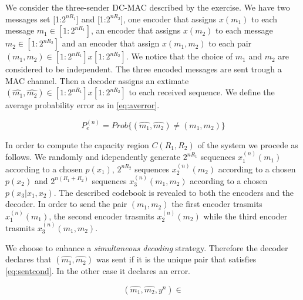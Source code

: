 
We consider the three-sender DC-MAC described by the exercise. We have two messages set [1:$2^{nR_1}$] and [1:$2^{nR_2}$], one encoder that assigns $x(m_1)$ to each message $m_1 \in [1:2^{nR_1}]$, an encoder that assigns $x(m_2)$ to each message $m_2 \in [1:2^{nR_2}]$ and an encoder that assign $x(m_1,m_2)$ to each pair $(m_1,m_2) \in [1:2^{nR_1}]x[1:2^{nR_2}]$. We notice that the choice of $m_1$ and $m_2$ are considered to be independent. The three encoded messages are sent trough a MAC channel. Then a decoder assigns an extimate $(\hat{m_1},\hat{m_2}) \in [1:2^{nR_1}]x[1:2^{nR_2}]$ to each received sequence. We define the average probability error as in \eqref{eq:averror}.

\begin{equation}
	P_e^{(n)}=Prob\{(\hat{m_1},\hat{m_2}) \neq (m_1,m_2)\}
	\label{eq:averror}
\end{equation}

In order to compute the capacity region $C(R_1, R_2)$ of the system we procede as follows. We randomly and idependently generate $2^{nR_1}$ sequences $x_1^{(n)}(m_1)$ according to a chosen $p(x_1)$, $2^{nR_2}$ sequences $x_2^{(n)}(m_2)$ according to a chosen $p(x_2)$ and $2^{n(R_1+R_2)}$ sequences $x_3^{(n)}(m_1,m_2)$ according to a chosen $p(x_3|x_1,x_2)$. The described codebook is revealed to both the encoders and the decoder. In order to send the pair $(m_1,m_2)$ the first encoder trasmits $x_1^{(n)}(m_1)$, the second encoder trasmits $x_2^{(n)}(m_2)$ while the third encoder trasmits $x_3^{(n)}(m_1,m_2)$.

We choose to enhance a \textit{simultaneous decoding} strategy. Therefore the decoder declares that $(\hat{m_1},\hat{m_2})$ was sent if it is the unique pair that satisfies \eqref{eq:sentcond}. In the other case it declares an error. 

\begin{equation}
	(\hat{m_1},\hat{m_2},y^n) \in
	\label{eq:sentcond}
\end{equation}
